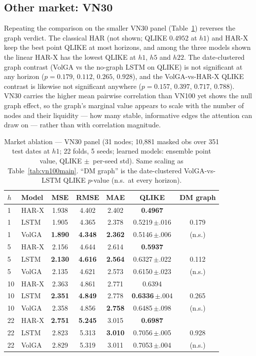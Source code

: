 \documentclass[runningheads]{llncs}
\begin{document}
\subsection{Other market: VN30}\label{sec:vn30}
Repeating the comparison on the smaller VN30 panel (Table~\ref{tab:vn30}) reverses the graph verdict.
The classical HAR (not shown; QLIKE $0.4952$ at $h1$) and HAR-X keep the best point QLIKE at most
horizons, and among the three models shown the linear HAR-X has the lowest QLIKE at $h1$, $h5$ and
$h22$. The date-clustered graph contrast (VolGA vs the no-graph LSTM on QLIKE) is not significant at
any horizon ($p=0.179$, $0.112$, $0.265$, $0.928$), and the VolGA-vs-HAR-X QLIKE contrast is likewise
not significant anywhere ($p=0.157$, $0.397$, $0.717$, $0.788$). VN30 carries the higher mean
pairwise correlation than VN100 yet shows the null graph effect, so the graph's marginal value appears
to scale with the number of nodes and their liquidity --- how many stable, informative edges the
attention can draw on --- rather than with correlation magnitude.

\begin{table}[t]
\centering
\caption{Market ablation --- VN30 panel (31 nodes; 10{,}881 masked obs over 351 test dates at $h1$;
22 folds, 5 seeds; learned models: ensemble point value, QLIKE $\pm$~per-seed std). Same scaling as
Table~\ref{tab:vn100main}. ``DM graph'' is the date-clustered VolGA-vs-LSTM QLIKE $p$-value (n.s.\ at
every horizon).}
\label{tab:vn30}
\footnotesize
\setlength{\tabcolsep}{6pt}
\begin{tabular}{llccccc}
\toprule
$h$ & Model & MSE & RMSE & MAE & QLIKE & DM graph \\
\midrule
1 & HAR-X & 1.938 & 4.402 & 2.402 & \textbf{0.4967} & \\
1 & LSTM  & 1.905 & 4.365 & 2.378 & 0.5219\,$\pm$.016 & 0.179 \\
1 & VolGA & \textbf{1.890} & \textbf{4.348} & \textbf{2.362} & 0.5146\,$\pm$.006 & (n.s.) \\
\midrule
5 & HAR-X & 2.156 & 4.644 & 2.614 & \textbf{0.5937} & \\
5 & LSTM  & \textbf{2.130} & \textbf{4.616} & \textbf{2.564} & 0.6327\,$\pm$.022 & 0.112 \\
5 & VolGA & 2.135 & 4.621 & 2.573 & 0.6150\,$\pm$.023 & (n.s.) \\
\midrule
10 & HAR-X & 2.363 & 4.861 & 2.771 & 0.6394 & \\
10 & LSTM  & \textbf{2.351} & \textbf{4.849} & 2.778 & \textbf{0.6336}\,$\pm$.004 & 0.265 \\
10 & VolGA & 2.358 & 4.856 & \textbf{2.758} & 0.6485\,$\pm$.098 & (n.s.) \\
\midrule
22 & HAR-X & \textbf{2.751} & \textbf{5.245} & 3.015 & \textbf{0.6987} & \\
22 & LSTM  & 2.823 & 5.313 & \textbf{3.010} & 0.7056\,$\pm$.005 & 0.928 \\
22 & VolGA & 2.829 & 5.319 & 3.011 & 0.7053\,$\pm$.004 & (n.s.) \\
\bottomrule
\end{tabular}
\end{table}
\end{document}
